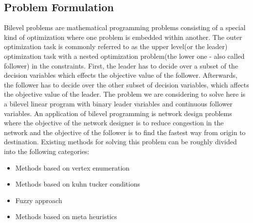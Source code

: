 \documentclass{article}
\begin{document}
\subsection{Problem Formulation}
Bilevel problems are mathematical programming problems consisting of a special kind of optimization where one problem is embedded within another. The outer optimization task is commonly referred to as the upper level(or the leader) optimization task with a nested optimization problem(the lower one - also called follower) in the constraints. First, the leader has to decide over a subset of the decision variables which effects the objective value of the follower. Afterwards, the follower has to decide over the other subset of decision variables, which affects the objective value of the leader. The problem we are considering to solve here is a bilevel linear program with binary leader variables and continuous follower variables. An application of bilevel programming is network design problems where the objective of the network designer is to reduce congestion in the network and the objective of the follower is to find the fastest way from origin to destination. Existing methods for solving this problem can be roughly divided into the following categories:\par
\begin{itemize}
\item Methods based on vertex enumeration
\item Methods based on kuhn tucker conditions
\item Fuzzy approach
\item Methods based on meta heuristics
\end{itemize}
\end{document}
